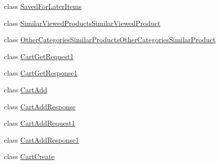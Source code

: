 \begin{DoxyCompactItemize}
class \hyperlink{class_price___comparison_1_1amazon_1_1ecs_1_1_saved_for_later_items}{Saved\-For\-Later\-Items}
\begin{DoxyCompactList}\small\item\em \end{DoxyCompactList}\item 
class \hyperlink{class_price___comparison_1_1amazon_1_1ecs_1_1_similar_viewed_products_similar_viewed_product}{Similar\-Viewed\-Products\-Similar\-Viewed\-Product}
\begin{DoxyCompactList}\small\item\em \end{DoxyCompactList}\item 
class \hyperlink{class_price___comparison_1_1amazon_1_1ecs_1_1_other_categories_similar_products_other_categories_similar_product}{Other\-Categories\-Similar\-Products\-Other\-Categories\-Similar\-Product}
\begin{DoxyCompactList}\small\item\em \end{DoxyCompactList}\item 
class \hyperlink{class_price___comparison_1_1amazon_1_1ecs_1_1_cart_get_request1}{Cart\-Get\-Request1}
\item 
class \hyperlink{class_price___comparison_1_1amazon_1_1ecs_1_1_cart_get_response1}{Cart\-Get\-Response1}
\item 
class \hyperlink{class_price___comparison_1_1amazon_1_1ecs_1_1_cart_add}{Cart\-Add}
\begin{DoxyCompactList}\small\item\em \end{DoxyCompactList}\item 
class \hyperlink{class_price___comparison_1_1amazon_1_1ecs_1_1_cart_add_response}{Cart\-Add\-Response}
\begin{DoxyCompactList}\small\item\em \end{DoxyCompactList}\item 
class \hyperlink{class_price___comparison_1_1amazon_1_1ecs_1_1_cart_add_request1}{Cart\-Add\-Request1}
\item 
class \hyperlink{class_price___comparison_1_1amazon_1_1ecs_1_1_cart_add_response1}{Cart\-Add\-Response1}
\item 
class \hyperlink{class_price___comparison_1_1amazon_1_1ecs_1_1_cart_create}{Cart\-Create}
\begin{DoxyCompactList}\small\item\em \end{DoxyCompactList}\item 

\end{DoxyCompactItemize}
